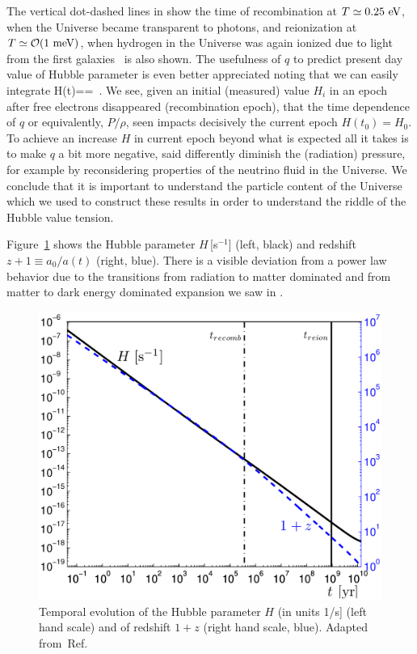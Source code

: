 The vertical dot-dashed lines in  show the time of recombination at $T\simeq0.25\text{ eV}$, when the Universe became transparent to photons, and reionization at $T\simeq {\cal O}(1\meV)$, when hydrogen in the Universe was again ionized due to light from the first galaxies~\cite{Zaroubi:2012in} is also shown.  The usefulness of $q$ to predict present day value of Hubble parameter is even better appreciated noting that we can easily  integrate  
\beqn\label{eq:HdotInt}
H(t)==
\,.
\eeqn
We see, given an initial (measured) value $H_i$ in an epoch after free electrons disappeared (recombination epoch), that the time dependence of $q$ or equivalently, $P/\rho$, seen  impacts decisively the current epoch $H(t_0)=H_0$. To achieve an increase $H$ in current epoch beyond what is expected all it takes is to make $q$ a bit more negative, said differently diminish the (radiation) pressure, for example by reconsidering properties of the neutrino fluid in the Universe. We conclude that it is important to understand the particle content of the Universe which we used to construct these results in order to understand the riddle of the Hubble value tension.

Figure~\ref{fig:today1} shows the Hubble parameter $H$\,[s$^{-1}$] (left, black) and redshift $z+1\equiv a_0/a(t)$ (right, blue).  There is a visible deviation from a power law behavior due to the transitions from radiation to matter dominated and from matter to dark energy dominated expansion we saw in .   

\begin{figure}
\centerline{\includegraphics[width=0.88\linewidth]{01-introduction/Figures/Hztoday.png}}
\caption{Temporal evolution of the Hubble parameter $H$ (in units 1/s] (left hand scale) and of redshift $1+z$ (right hand scale, blue). Adapted from~Ref.\,\cite{Rafelski:2013yka} 
\label{fig:today1} }
\end{figure}


